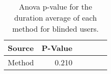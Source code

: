 
\begin{table}[!htb]
\centering
\caption{Anova p-value for the duration average of each method for blinded users.}
\label{tab:blockedanova_duration_avg}
\begin{tabular}{lrrrrr}
\toprule
Source & P-Value \\
\midrule
Method &   0.210 \\
\bottomrule
\end{tabular}
\end{table}

